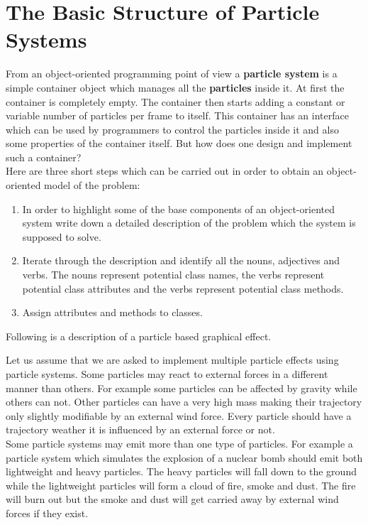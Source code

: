 \section{The Basic Structure of Particle Systems}
From an object-oriented programming point of view a \textbf{particle system} is a simple container object which manages all the \textbf{particles} inside it. At first the container is completely empty. The container then starts adding a constant or variable number of particles per frame to itself. This container has an interface which can be used by programmers to control the particles inside it and also some properties of the container itself. But how does one design and implement such a container?\\

Here are three short steps which can be carried out in order to obtain an object-oriented model of the problem:
\begin{enumerate}
	\item In order to highlight some of the base components of an object-oriented system write down a detailed description of the problem which the system is supposed to solve.
	
	\item Iterate through the description and identify all the nouns, adjectives and verbs. The nouns represent potential class names, the verbs represent potential class attributes and the verbs represent potential class methods.
	
	\item Assign attributes and methods to classes.
\end{enumerate}

Following is a description of a particle based graphical effect.

\newpage

Let us assume that we are asked to implement multiple particle effects using particle systems. Some particles may react to external forces in a different manner than others. For example some particles can be affected by gravity while others can not. Other particles can have a very high mass making their trajectory only slightly modifiable by an external wind force. Every particle should have a trajectory weather it is influenced by an external force or not.\\

Some particle systems may emit more than one type of particles. For example a particle system which simulates the explosion of a nuclear bomb should emit both lightweight and heavy particles. The heavy particles will fall down to the ground while the lightweight particles will form a cloud of fire, smoke and dust. The fire will burn out but the smoke and dust will get carried away by external wind forces if they exist.\\

